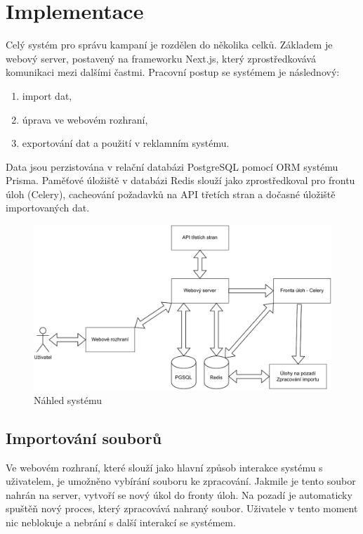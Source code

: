 \chapter{Implementace}
\label{chap:implementation}
Celý systém pro správu kampaní je rozdělen do několika celků. Základem je webový server, postavený na frameworku Next.js, který zprostředkovává komunikaci mezi dalšími častmi.
Pracovní postup se systémem je následnový:
\begin{enumerate}
    \item import dat,
    \item úprava ve webovém rozhraní,
    \item exportování dat a použití v reklamním systému.
\end{enumerate}
Data jsou perzistována v relační databázi PostgreSQL pomocí ORM systému Prisma.
Paměťové úložiště v databázi Redis slouží jako zprostředkoval pro frontu úloh (Celery), cacheování požadavků na API třetích stran a dočasné úložiště importovaných dat.

\begin{figure}[h]
    \centering
    \includegraphics[width=1\textwidth]{Figures/system-overview.pdf}
    \caption{Náhled systému}
    \label{fig:system-overview}
\end{figure}

\section{Importování souborů}
Ve webovém rozhraní, které slouží jako hlavní způsob interakce systému s uživatelem, je umožněno vybírání souboru ke zpracování.
Jakmile je tento soubor nahrán na server, vytvoří se nový úkol do fronty úloh. Na pozadí je automaticky spuštěň nový proces, který
zpracovává nahraný soubor. Uživatele v tento moment nic neblokuje a nebrání s další interakcí se systémem.

